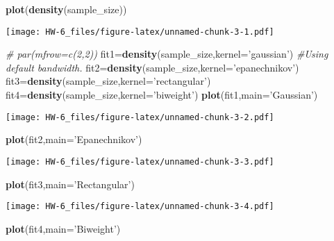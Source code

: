 \documentclass[]{article}
\newenvironment{Shaded}{\begin{snugshade}}{\end{snugshade}}
\newcommand{\CommentTok}[1]{\textcolor[rgb]{0.56,0.35,0.01}{\textit{#1}}}
\newcommand{\DataTypeTok}[1]{\textcolor[rgb]{0.13,0.29,0.53}{#1}}
\newcommand{\KeywordTok}[1]{\textcolor[rgb]{0.13,0.29,0.53}{\textbf{#1}}}
\newcommand{\NormalTok}[1]{#1}
\newcommand{\StringTok}[1]{\textcolor[rgb]{0.31,0.60,0.02}{#1}}
\begin{document}
\begin{Shaded}
\begin{Highlighting}[]
\KeywordTok{plot}\NormalTok{(}\KeywordTok{density}\NormalTok{(sample_size))}
\end{Highlighting}
\end{Shaded}

\texttt{[image: HW-6\_files/figure-latex/unnamed-chunk-3-1.pdf]}

\begin{Shaded}
\begin{Highlighting}[]
\CommentTok{# par(mfrow=c(2,2))}
\NormalTok{fit1=}\KeywordTok{density}\NormalTok{(sample_size,}\DataTypeTok{kernel=}\StringTok{'gaussian'}\NormalTok{) }\CommentTok{#Using default bandwidth.}
\NormalTok{fit2=}\KeywordTok{density}\NormalTok{(sample_size,}\DataTypeTok{kernel=}\StringTok{'epanechnikov'}\NormalTok{)}
\NormalTok{fit3=}\KeywordTok{density}\NormalTok{(sample_size,}\DataTypeTok{kernel=}\StringTok{'rectangular'}\NormalTok{)}
\NormalTok{fit4=}\KeywordTok{density}\NormalTok{(sample_size,}\DataTypeTok{kernel=}\StringTok{'biweight'}\NormalTok{)}
\KeywordTok{plot}\NormalTok{(fit1,}\DataTypeTok{main=}\StringTok{'Gaussian'}\NormalTok{)}
\end{Highlighting}
\end{Shaded}

\texttt{[image: HW-6\_files/figure-latex/unnamed-chunk-3-2.pdf]}

\begin{Shaded}
\begin{Highlighting}[]
\KeywordTok{plot}\NormalTok{(fit2,}\DataTypeTok{main=}\StringTok{'Epanechnikov'}\NormalTok{)}
\end{Highlighting}
\end{Shaded}

\texttt{[image: HW-6\_files/figure-latex/unnamed-chunk-3-3.pdf]}

\begin{Shaded}
\begin{Highlighting}[]
\KeywordTok{plot}\NormalTok{(fit3,}\DataTypeTok{main=}\StringTok{'Rectangular'}\NormalTok{)}
\end{Highlighting}
\end{Shaded}

\texttt{[image: HW-6\_files/figure-latex/unnamed-chunk-3-4.pdf]}

\begin{Shaded}
\begin{Highlighting}[]
\KeywordTok{plot}\NormalTok{(fit4,}\DataTypeTok{main=}\StringTok{'Biweight'}\NormalTok{)}
\end{Highlighting}
\end{Shaded}
\end{document}
